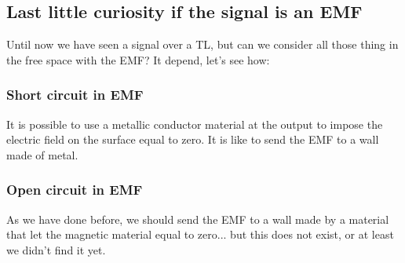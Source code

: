 \subsection*{Last little curiosity if the signal is an EMF}
Until now we have seen a signal over a TL, but can we consider all those thing in the free space with the EMF? It depend, let's see how:
\subsubsection*{Short circuit in EMF}
It is possible to use a metallic conductor material at the output to impose the electric field on the surface equal to zero. It is like to send the EMF to a wall made of metal.
\subsubsection*{Open circuit in EMF}
As we have done before, we should send the EMF to a wall made by a material that let the magnetic material equal to zero... but this does not exist, or at least we didn't find it yet.